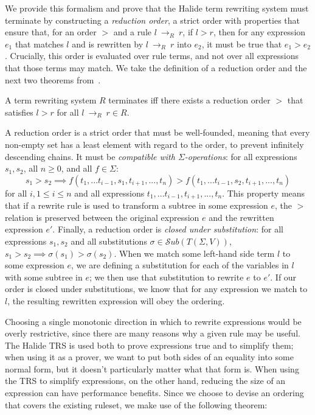 \documentclass[acmsmall,review]{acmart}\settopmatter{printfolios=true,printccs=false,printacmref=false}
\newcommand{\rewrites}[0]{\:\rightarrow_{R}\:}
\begin{document}
We provide this formalism and prove that the Halide term rewriting system must terminate by constructing a \emph{reduction order}, a strict order with properties that ensure that, for an order $>$ and a rule $l \rewrites r$, if $l > r$, then for any expression $e_1$ that matches $l$ and is rewritten by $l \rewrites r$ into $e_2$, it must be true that $e_1 > e_2$. Crucially, this order is evaluated over rule terms, and not over all expressions that those terms may match. We take the definition of a reduction order and the next two theorems from~\citet{baader1999term}.

\begin{theorem}\label{theorem:terminates}
A term rewriting system $R$ terminates iff there exists a reduction order $>$ that satisfies $l > r$ for all $l \rewrites r \in R$.
\end{theorem}

A reduction order is a strict order that must be well-founded, meaning that every non-empty set has a least element with regard to the order, to prevent infinitely descending chains. It must be \emph{compatible with $\Sigma$-operations}: for all expressions $s_1, s_2$, all $n \geq 0$, and all $f \in \Sigma$:
\[
s_1 > s_2 \implies f(t_1,...t_{i-1},s_1,t_{i+1},...,t_n) > f(t_1,...t_{i-1},s_2,t_{i+1},...,t_n)
\]
for all $i, 1 \leq i \leq n$ and all expressions $t_1,...t_{i-1},t_{i+1},...,t_n$. This property means that if a rewrite rule is used to transform a subtree in some expression $e$, the $>$ relation is preserved between the original expression $e$ and the rewritten expression $e'$. Finally, a reduction order is \emph{closed under substitution}: for all expressions $s_1, s_2$ and all substitutions $\sigma \in \mathcal{S}ub(T(\Sigma,V))$, 
$s_1 > s_2 \implies \sigma(s_1) > \sigma(s_2)$. When we match some left-hand side term $l$ to some expression $e$, we are defining a substitution for each of the variables in $l$ with some subtree in $e$; we then use that substitution to rewrite $e$ to $e'$. If our order is closed under substitutions, we know that for any expression we match to $l$, the resulting rewritten expression will obey the ordering.

Choosing a single monotonic direction in which to rewrite expressions would be overly restrictive, since there are many reasons why a given rule may be useful. The Halide TRS is used both to prove expressions true and to simplify them; when using it as a prover, we want to put both sides of an equality into some normal form, but it doesn't particularly matter what that form is. When using the TRS to simplify expressions, on the other hand, reducing the size of an expression can have performance benefits. Since we choose to devise an ordering that covers the existing ruleset, we make use of the following theorem:
\end{document}
